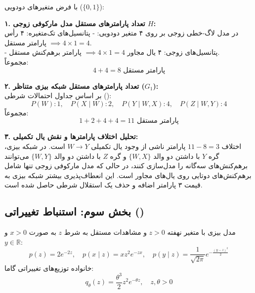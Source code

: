 با فرض متغیرهای دودویی ($\{0, 1\}$):

\textbf{۱. تعداد پارامترهای مستقل مدل مارکوفی زوجی $H$:} \\
در مدل لاگ-خطی زوجی بر روی ۴ متغیر دودویی:
- پتانسیل‌های تک‌متغیره: ۴ رأس $\implies 4 \times 1 = 4$ پارامتر مستقل. \\
- پتانسیل‌های زوجی: ۴ یال مجاور $\implies 4 \times 1 = 4$ پارامتر برهم‌کنش مستقل. \\
مجموعاً:
\begin{equation}
  4 + 4 = 8 \text{ پارامتر مستقل}
\end{equation}

\textbf{۲. تعداد پارامترهای مستقل شبکه بیزی متناظر ($G_1$):} \\
بر اساس جداول احتمالات شرطی ():
\[
  P(W): 1, \quad P(X \mid W): 2, \quad P(Y \mid W, X): 4, \quad P(Z \mid W, Y): 4
\]
مجموعاً:
\begin{equation}
  1 + 2 + 4 + 4 = 11 \text{ پارامتر مستقل}
\end{equation}

\textbf{۳. تحلیل اختلاف پارامترها و نقش یال تکمیلی:} \\
اختلاف $11 - 8 = 3$ پارامتر ناشی از وجود یال تکمیلی $W \to Y$ است. در شبکه بیزی، گره $Y$ با داشتن دو والد $\{W, X\}$ و گره $Z$ با داشتن دو والد $\{W, Y\}$ می‌توانند برهم‌کنش‌های سه‌گانه را مدل‌سازی کنند، در حالی که مدل مارکوفی زوجی تنها شامل برهم‌کنش‌های دوتایی روی یال‌های مجاور است. این انعطاف‌پذیری بیشتر شبکه بیزی به قیمت ۳ پارامتر اضافه و حذف یک استقلال شرطی حاصل شده است.

\subsection{بخش سوم: استنباط تغییراتی ()}
\label{sec:q1-vi}

مدل بیزی با متغیر نهفته $z > 0$ و مشاهدات مستقل به شرط $z$ به صورت $x > 0$ و $y \in \mathbb{R}$:
\[
  p(z) = 2 e^{-2z}, \quad p(x \mid z) = x z^2 e^{-z x}, \quad p(y \mid z) = \frac{1}{\sqrt{2\pi}} e^{-\frac{(y-z)^2}{2}}
\]
خانواده توزیع‌های تغییراتی گاما:
\[
  q_\theta(z) = \frac{\theta^3}{2} z^2 e^{-\theta z}, \quad z, \theta > 0
\]

